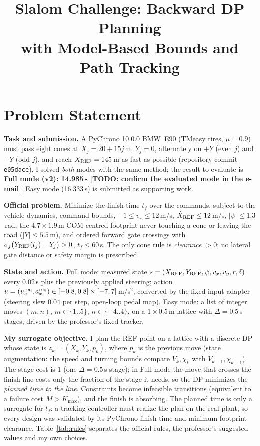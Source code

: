\documentclass[conference]{IEEEtran}
\title{Slalom Challenge: Backward DP Planning\\ with Model-Based Bounds and Path Tracking}
\author{
  \IEEEauthorblockN{[Your Name]}
  \IEEEauthorblockA{[Student ID] \\
  Learning-Based Control for Mobility Systems, 2026}
}
\newcommand{\todo}[1]{\textbf{[TODO: #1]}}
\begin{document}
\maketitle

\section{Problem Statement}
\textbf{Task and submission.} A PyChrono 10.0.0 BMW~E90 (TMeasy tires,
$\mu=0.9$) must pass eight cones at $X_j=20+15j$\,m, $Y_j=0$, alternately on
$+Y$ (even $j$) and $-Y$ (odd $j$), and reach $X_{\rm REF}=145$\,m as fast as
possible (repository commit \texttt{e05dace}). I solved \emph{both} modes with
the same method; the result to evaluate is \textbf{Full mode (v2):
14.985\,s} \todo{confirm the evaluated mode in the e-mail}. Easy mode
(16.333\,s) is submitted as supporting work.

\textbf{Official problem.} Minimize the finish time $t_f$ over the commands,
subject to the vehicle dynamics, command bounds, $-1\le v_x\le 12$\,m/s,
$\dot X_{\rm REF}\le 12$\,m/s, $|\psi|\le 1.3$\,rad, the $4.7\times1.9$\,m
COM-centred footprint never touching a cone or leaving the road
($|Y|\le5.5$\,m), and ordered forward gate crossings with
$\sigma_j\bigl(Y_{\rm REF}(t_j)-Y_j\bigr)>0$, $t_f\le60$\,s. The only cone
rule is \emph{clearance $>0$}; no lateral gate distance or safety margin is
prescribed.

\textbf{State and action.} Full mode: measured state
$s=(X_{\rm REF},Y_{\rm REF},\psi,v_x,v_y,r,\delta)$ every $0.02$\,s plus the
previously applied steering; action
$u=(u_s^{\rm req},a_x^{\rm req})\in[-0.8,0.8]\times[-7,7]$\,m/s$^2$, converted
by the fixed input adapter (steering slew $0.04$ per step, open-loop pedal map).
Easy mode: a list of integer moves $(m,n)$, $m\in\{1..5\}$, $n\in\{-4..4\}$,
on a $1\times0.5$\,m lattice with $\Delta=0.5$\,s stages, driven by the
professor's fixed tracker.

\textbf{My surrogate objective.} I plan the REF point on a lattice with a
discrete DP whose state is $z_k=(X_k,Y_k,p_k)$, where $p_k$ is the previous
move (state augmentation: the speed and turning bounds compare
$V_k,\chi_k$ with $V_{k-1},\chi_{k-1}$). The stage cost is $1$ (one
$\Delta=0.5$\,s stage); in Full mode the move that crosses the finish line
costs only the fraction of the stage it needs, so the DP minimizes the
\emph{planned time to the line}. Constraints become infeasible transitions
(equivalent to a failure cost $M>K_{\max}$), and the finish is absorbing. The
planned time is only a surrogate for $t_f$: a tracking controller must realize
the plan on the real plant, so every design was validated by its PyChrono finish
time and minimum footprint clearance. Table~\ref{tab:rules} separates the
official rules, the professor's suggested values and my own choices.
\end{document}

